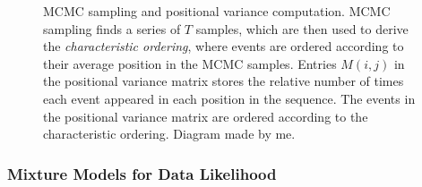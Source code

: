 \begin{figure}
\caption[Event-based model - MCMC sampling diagram]{MCMC sampling and positional variance computation. MCMC sampling finds a series of $T$ samples, which are then used to derive the \emph{characteristic ordering}, where events are ordered according to their average position in the MCMC samples. Entries $M(i,j)$ in the positional variance matrix stores the relative number of times each event appeared in each position in the sequence. The events in the positional variance matrix are ordered according to the characteristic ordering.  Diagram made by me.}
\label{fig:bckEbmMcmc}
\end{figure}

\subsubsection{Mixture Models for Data Likelihood}
\label{sec:mix_models}

